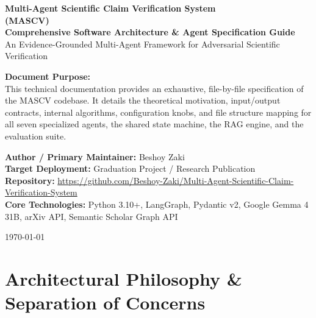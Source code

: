 \documentclass[11pt,a4paper]{article}
\begin{document}

\begin{titlepage}
\centering
\vspace*{1.5cm}

{\huge\textbf{Multi-Agent Scientific Claim Verification System\\(MASCV)}}\\[0.6cm]
{\Large\textbf{Comprehensive Software Architecture \& Agent Specification Guide}}\\[0.4cm]
{\large An Evidence-Grounded Multi-Agent Framework for Adversarial Scientific Verification}

\vspace{1.5cm}
\begin{tcolorbox}[colback=blue!5!white,colframe=blue!60!black,arc=3mm,width=0.92\textwidth]
\centering
\textbf{Document Purpose:}\\[0.2cm]
\small
This technical documentation provides an exhaustive, file-by-file specification of the MASCV codebase. It details the theoretical motivation, input/output contracts, internal algorithms, configuration knobs, and file structure mapping for all seven specialized agents, the shared state machine, the RAG engine, and the evaluation suite.
\end{tcolorbox}

\vspace{1.5cm}
\begin{flushleft}
\textbf{Author / Primary Maintainer:} Beshoy Zaki\\
\textbf{Target Deployment:} Graduation Project / Research Publication\\
\textbf{Repository:} \url{https://github.com/Beshoy-Zaki/Multi-Agent-Scientific-Claim-Verification-System}\\
\textbf{Core Technologies:} Python 3.10+, LangGraph, Pydantic v2, Google Gemma 4 31B, arXiv API, Semantic Scholar Graph API
\end{flushleft}

\vfill
{\large \today}
\end{titlepage}

\tableofcontents
\newpage

\section{Architectural Philosophy \& Separation of Concerns}
\end{document}
